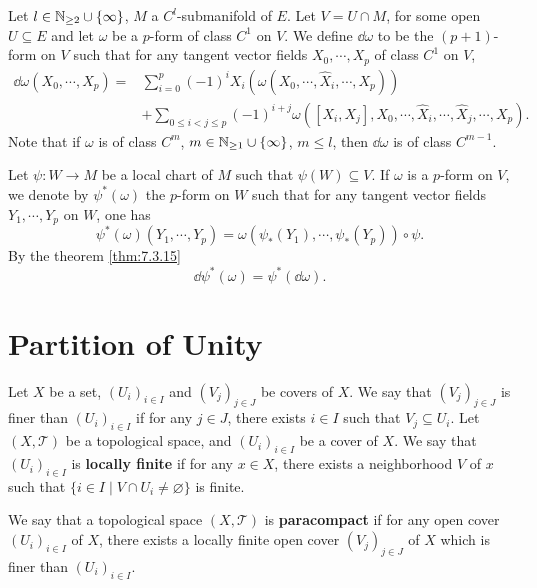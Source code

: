 \begin{definitionenv}\label{def:7.5.12}
    Let $l \in \mathbb{N}_{\ge 2} \cup \{\infty\}$, $M$ a $C^l$-submanifold of $E$.
    Let $V = U \cap M$, for some open $U \subseteq E$ and let $\omega$ be a $p$-form of class $C^1$ on $V$.
    We define $\dd \omega$ to be the $(p+1)$-form on $V$ such that for any tangent vector fields $X_0,\cdots,X_p$ of class $C^1$ on $V$,
    $$\begin{aligned}
        \dd \omega(X_0,\cdots,X_p) = & \sum_{i=0}^p (-1)^{i} X_i(\omega(X_0,\cdots,\hat{X}_i,\cdots,X_p))\\
        & + \sum_{0 \le i < j \le p}(-1)^{i + j}\omega([X_i,X_j], X_0,\cdots,\hat{X}_i,\cdots,\hat{X}_j,\cdots,X_p).
    \end{aligned}$$
    Note that if $\omega$ is of class $C^m$, $m \in \mathbb{N}_{\ge 1} \cup \{\infty\}$, $m \le l$, then $\dd \omega$ is of class $C^{m-1}$.
\end{definitionenv}

\begin{remark}
    Let $\psi : W \longrightarrow M$ be a local chart of $M$ such that $\psi (W) \subseteq V$.
    If $\omega$ is a $p$-form on $V$, we denote by $\psi^*(\omega)$ the $p$-form on $W$ such that for any tangent vector fields $Y_1,\cdots,Y_p$ on $W$, one has
    $$\psi^*(\omega)(Y_1,\cdots,Y_p) = \omega(\psi_* (Y_1),\cdots,\psi_* (Y_p)) \circ \psi.$$
    By the theorem \ref{thm:7.3.15}
    $$\dd \psi^*(\omega) = \psi^*(\dd \omega).$$
\end{remark}


\section{Partition of Unity}

\begin{definitionenv}
    Let $X$ be a set, $(U_i)_{i \in I}$ and $(V_j)_{j \in J}$ be covers of $X$.
    We say that $(V_j)_{j \in J}$ is finer than $(U_i)_{i \in I}$ if for any $j \in J$, there exists $i \in I$ such that $V_j \subseteq U_i$.
    Let $(X,\mathscr{T})$ be a topological space, and $(U_i)_{i \in I}$ be a cover of $X$.
    We say that $(U_i)_{i \in I}$ is \textbf{locally finite} if for any $x \in X$, there exists a neighborhood $V$ of $x$ such that 
    $\{i \in I \mid V \cap U_i \neq \varnothing\}$ is finite.

    \quad We say that a topological space $(X,\mathscr{T})$ is \textbf{paracompact} if for any open cover $(U_i)_{i \in I}$ of $X$, there exists a locally finite open cover $(V_j)_{j \in J}$ of $X$ which is finer than $(U_i)_{i \in I}$.
\end{definitionenv}


